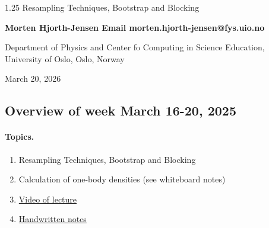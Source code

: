\documentclass[%
oneside,                 %
final,                   %
10pt]{article}
\begin{document}

\newcommand{\exercisesection}[1]{\subsection*{#1}}






\thispagestyle{empty}

\begin{center}
{\LARGE\bf
\begin{spacing}{1.25}
Resampling Techniques, Bootstrap and Blocking
\end{spacing}
}
\end{center}


\begin{center}
{\bf Morten Hjorth-Jensen  Email morten.hjorth-jensen@fys.uio.no}
\end{center}

    \begin{center}
\centerline{{\small Department of Physics and Center fo Computing in Science Education, University of Oslo, Oslo, Norway}}
\end{center}
    

\begin{center}
March 20, 2026
\end{center}

\vspace{1cm}


\subsection*{Overview of week March 16-20, 2025}

\paragraph{Topics.}
\begin{enumerate}
\item Resampling Techniques, Bootstrap and Blocking 

\item Calculation of one-body densities (see whiteboard notes)

\item \href{{https://youtu.be/cnPh5FuGf3o}}{Video of lecture}

\item \href{{https://github.com/CompPhysics/ComputationalPhysics2/blob/gh-pages/doc/HandWrittenNotes/2025/NotesMarch21.pdf}}{Handwritten notes}
\end{enumerate}
\end{document}
